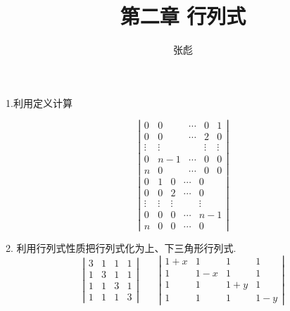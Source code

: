 \documentclass[13pt,fontset=mac]{ctexbeamer}
\begin{document}
\title[]{第二章 \quad 行列式}
\author[]{{\large 张彪}\\  }

\date{}


\AtBeginSection[]
{
\setcounter{exa}{0}
\setcounter{equation}{0}
}


\begin{frame}
\maketitle
\end{frame}


\begin{frame}{ 1.利用定义计算 }

\[
		\left|\begin{array}{ccccc}
			0 & 0 & \cdots & 0 & 1 \\
			0 & 0 & \cdots & 2 & 0 \\
			\vdots & \vdots & & \vdots & \vdots \\
			0 & n-1 & \cdots & 0 & 0 \\
			n & 0 & \cdots & 0 & 0
		\end{array}\right| 
\]
\vspace{20pt}
\[
			\left|
	\begin{array}{ccccc}
			0 & 1 & 0 & \cdots & 0 \\
			0 & 0 & 2 & \cdots & 0 \\
			\vdots & \vdots & \vdots & & \vdots \\
			0 & 0 & 0 & \cdots & n-1 \\
			n & 0 & 0 & \cdots & 0
		\end{array}\right|
\]

\end{frame}



\begin{frame}{2. 利用行列式性质把行列式化为上、下三角形行列式.}
\[
	\left|\begin{array}{llll}
		3 & 1 & 1 & 1 \\
		1 & 3 & 1 & 1 \\
		1 & 1 & 3 & 1 \\
		1 & 1 & 1 & 3
	\end{array}\right|
\qquad
	\left|\begin{array}{cccc}
		1+x & 1 & 1 & 1 \\
		1 & 1-x & 1 & 1 \\
		1 & 1 & 1+y & 1 \\
		1 & 1 & 1 & 1-y
	\end{array}\right|
\]
\end{frame}
\end{document}
